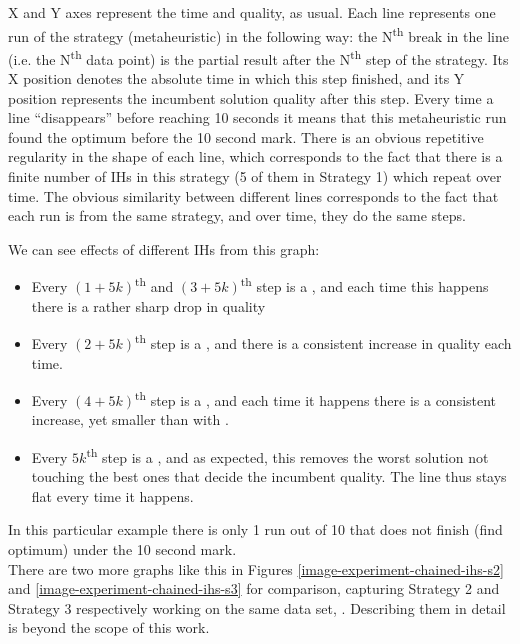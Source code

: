 X and Y axes represent the time and quality, as usual. Each line represents one run of the strategy (metaheuristic) in the following way: the N\textsuperscript{th} break in the line (i.e. the N\textsuperscript{th} data point) is the partial result after the N\textsuperscript{th} step of the strategy. Its X position denotes the absolute time in which this step finished, and its Y position represents the incumbent solution quality after this step. Every time a line ``disappears'' before reaching 10 seconds it means that this metaheuristic run found the optimum before the 10 second mark. There is an obvious repetitive regularity in the shape of each line, which corresponds to the fact that there is a finite number of IHs in this strategy (5 of them in Strategy 1) which repeat over time. The obvious similarity between different lines corresponds to the fact that each run is from the same strategy, and over time, they do the same steps.

We can see effects of different IHs from this graph:
\begin{itemize}
	\item Every $(1 + 5k)$\textsuperscript{th} and $(3 + 5k)$\textsuperscript{th} step is a , and each time this happens there is a rather sharp drop in quality
	\item Every $(2 + 5k)$\textsuperscript{th} step is a , and there is a consistent increase in quality each time.
	\item Every $(4 + 5k)$\textsuperscript{th} step is a , and each time it happens there is a consistent increase, yet smaller than with .
	\item Every $5k$\textsuperscript{th} step is a , and as expected, this removes the worst solution not touching the best ones that decide the incumbent quality. The line thus stays flat every time it happens.
\end{itemize}

In this particular example there is only 1 run out of 10 that does not finish (find optimum) under the 10 second mark.\\

There are two more graphs like this in Figures \ref{image-experiment-chained-ihs-s2} and \ref{image-experiment-chained-ihs-s3} for comparison, capturing Strategy 2 and Strategy 3 respectively working on the same data set, . Describing them in detail is beyond the scope of this work.\\

